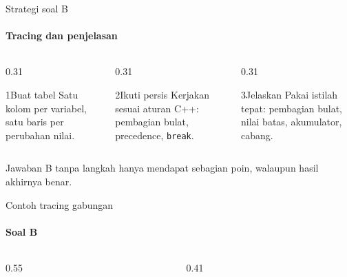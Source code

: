 \documentclass[t]{beamer}
\begin{document}
\begin{frame}{Strategi soal B}
\framesubtitle{Tracing dan penjelasan}
\begin{columns}[T]
\begin{column}{0.31\textwidth}
\begin{Langkah}{1}{Buat tabel}
Satu kolom per variabel, satu baris per perubahan nilai.
\end{Langkah}
\end{column}
\begin{column}{0.31\textwidth}
\begin{Langkah}{2}{Ikuti persis}
Kerjakan sesuai aturan C++: pembagian bulat, precedence, \texttt{break}.
\end{Langkah}
\end{column}
\begin{column}{0.31\textwidth}
\begin{Langkah}{3}{Jelaskan}
Pakai istilah tepat: pembagian bulat, nilai batas, akumulator, cabang.
\end{Langkah}
\end{column}
\end{columns}
\vspace{8pt}
Jawaban B tanpa langkah hanya mendapat sebagian poin, walaupun hasil akhirnya benar.
\end{frame}

\begin{frame}[fragile]{Contoh tracing gabungan}
\framesubtitle{Soal B}
\begin{columns}[T]
\begin{column}{0.55\textwidth}
\end{column}
\begin{column}{0.41\textwidth}
\end{column}
\end{columns}
\end{frame}
\end{document}
